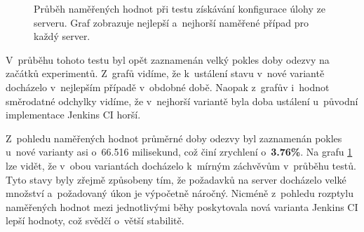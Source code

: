             \begin{figure}[h!t]
             \begin{adjustwidth}{-0.5cm}{}
                \begin{center}
                    \caption{Průběh naměřených hodnot při testu získávání konfigurace úlohy ze serveru.
                        Graf zobrazuje nejlepší a~nejhorší naměřené případ pro každý server.}
                    \label{imgGetFreestyleCast}
                \end{center}
             \end{adjustwidth}
            \end{figure}

            V~průběhu tohoto testu byl opět zaznamenán velký pokles doby odezvy na začátků experimentů.
            Z~grafů vidíme, že k~ustálení stavu v~nové variantě docházelo v~nejlepším případě v~obdobné době.
            Naopak z~grafův i~hodnot směrodatné odchylky vidíme,
            že v~nejhorší variantě byla doba ustálení u~původní implementace Jenkins CI horší.

            Z~pohledu naměřených hodnot průměrné doby odezvy byl zaznamenán pokles
            u~nové varianty asi o~66.516 milisekund, což činí zrychlení o~\textbf{3.76\%}.
            Na grafu \ref{imgGetFreestyleCast} lze vidět, že v~obou variantách 
            docházelo k~mírným záchvěvům v~průběhu testů. Tyto stavy byly zřejmě 
            způsobeny tím, že požadavků na server docházelo velké množství
            a~požadovaný úkon je výpočetně náročný. 
            Nicméně z~pohledu rozptylu naměřených hodnot mezi jednotlivými
            běhy poskytovala nová varianta Jenkins CI lepší hodnoty,
            což svědčí o~větší stabilitě.


